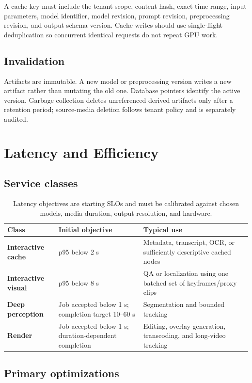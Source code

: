 \documentclass[11pt]{article}
\begin{document}
A cache key must include the tenant scope, content hash, exact time range, input
parameters, model identifier, model revision, prompt revision, preprocessing
revision, and output schema version. Cache writes should use single-flight
deduplication so concurrent identical requests do not repeat GPU work.

\subsection{Invalidation}

Artifacts are immutable. A new model or preprocessing version writes a new
artifact rather than mutating the old one. Database pointers identify the
active version. Garbage collection deletes unreferenced derived artifacts only
after a retention period; source-media deletion follows tenant policy and is
separately audited.

\section{Latency and Efficiency}

\subsection{Service classes}

\begin{table}[ht]
\centering
\begin{tabularx}{\textwidth}{>{\bfseries}p{32mm} p{28mm} X}
\toprule
Class & Initial objective & Typical use \\
\midrule
Interactive cache & p95 below 2 s & Metadata, transcript, OCR, or sufficiently
descriptive cached nodes \\
Interactive visual & p95 below 8 s & QA or localization using one batched set of
keyframes/proxy clips \\
Deep perception & Job accepted below 1 s; completion target 10--60 s &
Segmentation and bounded tracking \\
Render & Job accepted below 1 s; duration-dependent completion & Editing,
overlay generation, transcoding, and long-video tracking \\
\bottomrule
\end{tabularx}
\caption{Latency objectives are starting SLOs and must be calibrated against
chosen models, media duration, output resolution, and hardware.}
\end{table}

\subsection{Primary optimizations}
\end{document}
